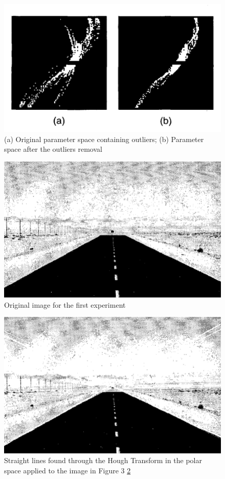 \documentclass[12pt]{article}
\begin{document}
\begin{figure}
    \centering
    \includegraphics[width=1\linewidth]{image2.png}
    \caption{(a) Original parameter space containing outliers; (b) Parameter space after the outliers removal}
    \label{label2}

\end{figure}
\begin{figure}
    \centering
    \includegraphics[width=0.75\linewidth]{image3.png}
    \caption{Original image for the first experiment}
    \label{label3}
\end{figure}
\begin{figure}
    \centering
    \includegraphics[width=0.75\linewidth]{image4.png}
    \caption{Straight lines found through the Hough Transform in the polar space applied to the image in Figure 3 \ref{label3}}
    \label{label4}
\end{figure}
\end{document}
